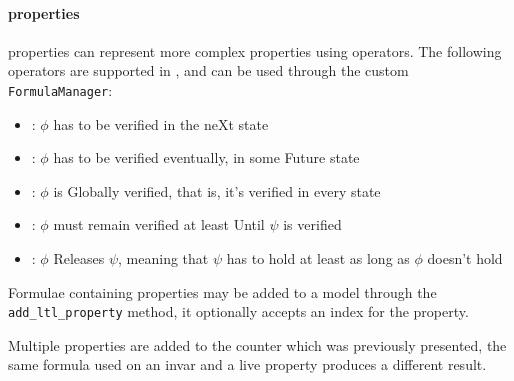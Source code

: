 \paragraph*{\ltl{} properties}

\ltl{} properties can represent more complex properties using \LTL{} operators.
The following \ltl{} operators are supported in \pyvmt{}, and can be used through the \pyvmt{} custom \texttt{FormulaManager}:
\begin{itemize}
    \item \fX{}: $\phi$ has to be verified in the neXt state
    \item \fF{}: $\phi$ has to be verified eventually, in some Future state
    \item \fG{}: $\phi$ is Globally verified, that is, it's verified in every state
    \item \fU{}: $\phi$ must remain verified at least Until $\psi$ is verified
    \item \fR{}: $\phi$ Releases $\psi$, meaning that $\psi$ has to hold at least as long as $\phi$ doesn't hold
\end{itemize}
Formulae containing \ltl{} properties may be added to a model through the \texttt{add\_ltl\_property} method, it optionally accepts an index for the property.

\begin{listing}
    \label{alg:properties}
    \caption{Multiple properties are added to the counter which was previously presented, the same formula used on an invar and a live property produces a different result.}
\end{listing}

